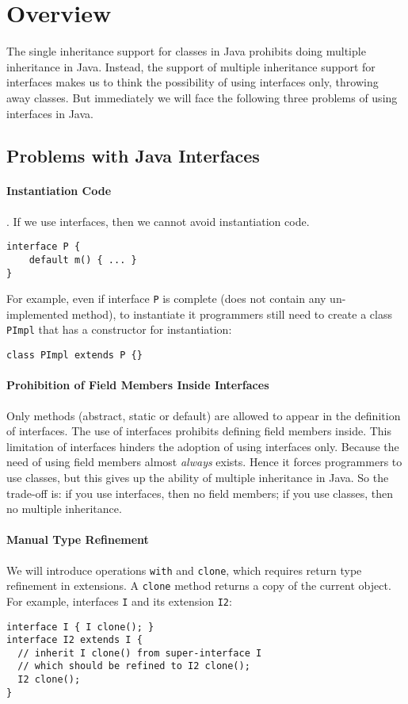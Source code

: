 \section{Overview}\label{sec:ep}
The single inheritance support for classes in Java prohibits doing multiple
inheritance in Java. Instead, the support of multiple inheritance support for
interfaces makes us to think the possibility of using interfaces only, throwing
away classes. But immediately we will face the following three problems of using
interfaces in Java.

\subsection{Problems with Java Interfaces}\label{sec:intf_prob}
\paragraph{Instantiation Code}. If we use interfaces, then we cannot
avoid instantiation code. 
\begin{lstlisting}
interface P {
    default m() { ... }
}
\end{lstlisting}
For example, even if interface \texttt{P} is complete (does not contain any
un-implemented method), to instantiate it programmers still need to create a
class \texttt{PImpl} that has a constructor for instantiation:
\begin{lstlisting}
class PImpl extends P {}
\end{lstlisting}

\paragraph{Prohibition of Field Members Inside Interfaces}
Only methods (abstract, static or default) are allowed to appear in the
definition of interfaces. The use of interfaces prohibits defining field members
inside. This limitation of interfaces hinders the adoption of using interfaces
only. Because the need of using field members almost \emph{always} exists. Hence
it forces programmers to use classes, but this gives up the ability of multiple
inheritance in Java. So the trade-off is: if you use interfaces, then no field
members; if you use classes, then no multiple inheritance.

\paragraph{Manual Type Refinement}
We will introduce operations \texttt{with} and \texttt{clone}, which requires
return type refinement in extensions. A \texttt{clone} method
returns a copy of the current object. For example, interfaces \texttt{I} and its
extension \texttt{I2}:
\begin{lstlisting}
interface I { I clone(); }
interface I2 extends I { 
  // inherit I clone() from super-interface I
  // which should be refined to I2 clone();
  I2 clone();
}
\end{lstlisting}
 
